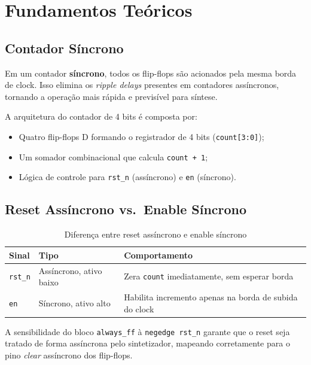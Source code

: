 \documentclass[12pt,a4paper]{article}
\begin{document}
\section{Fundamentos Teóricos}

\subsection{Contador Síncrono}

Em um contador \textbf{síncrono}, todos os flip-flops são acionados pela mesma
borda de clock. Isso elimina os \textit{ripple delays} presentes em contadores
assíncronos, tornando a operação mais rápida e previsível para síntese.

A arquitetura do contador de 4 bits é composta por:
\begin{itemize}[leftmargin=1.5cm]
  \item Quatro flip-flops D formando o registrador de 4 bits (\texttt{count[3:0]});
  \item Um somador combinacional que calcula \texttt{count + 1};
  \item Lógica de controle para \texttt{rst\_n} (assíncrono) e \texttt{en} (síncrono).
\end{itemize}

\subsection{Reset Assíncrono vs.\ Enable Síncrono}

\begin{table}[H]
  \centering
  \caption{Diferença entre reset assíncrono e enable síncrono}
  \label{tab:async_vs_sync}
  \begin{tabular}{lll}
    \toprule
    \textbf{Sinal} & \textbf{Tipo} & \textbf{Comportamento} \\
    \midrule
    \texttt{rst\_n} & Assíncrono, ativo baixo &
      Zera \texttt{count} imediatamente, sem esperar borda \\
    \texttt{en}     & Síncrono, ativo alto    &
      Habilita incremento apenas na borda de subida do clock \\
    \bottomrule
  \end{tabular}
\end{table}

A sensibilidade do bloco \texttt{always\_ff} à \texttt{negedge rst\_n} garante
que o reset seja tratado de forma assíncrona pelo sintetizador, mapeando
corretamente para o pino \textit{clear} assíncrono dos flip-flops.
\end{document}
